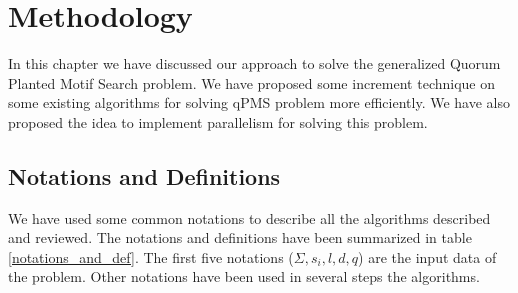 \chapter{Methodology}\label{methodology}

In this chapter we have discussed our approach to solve the generalized Quorum Planted Motif Search problem. We have proposed some increment technique on some existing algorithms for solving qPMS problem more efficiently. We have also proposed the idea to implement parallelism for solving this problem.

\section{Notations and Definitions}
We have used some common notations to describe all the algorithms described and reviewed. The notations and definitions have been summarized in table \cref{notations_and_def}. The first five notations ($\Sigma, s_i, l, d, q$) are the input data of the problem. Other notations have been used in several steps the algorithms. 


